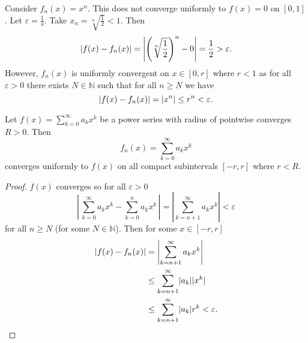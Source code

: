 \begin{example}
    Consider $f_n(x) = x^n$. This does not converge uniformly to $f(x) = 0$ on $[0, 1]$. Let $\varepsilon = \frac14$. Take $x_n = \sqrt[n]{\frac12} < 1$. Then \[ \lvert f(x) - f_n(x)\rvert = \left| \left( \sqrt[n]{\frac12} \right)^n - 0 \right| = \frac12 > \varepsilon. \] However, $f_n(x)$ is uniformly convergent on $x \in [0, r]$ where $r < 1$ as for all $\varepsilon > 0$ there exists $N \in \mathbb N$ such that for all $n \geq N$ we have \[ \lvert f(x) - f_n(x)\rvert = \lvert x^n\rvert \leq r^n < \varepsilon. \]
\end{example}

\begin{theorem}
    Let $f(x) = \sum_{k = 0}^\infty a_k x^k$ be a power series with radius of pointwise converges $R > 0$. Then \[ f_n(x) = \sum_{k = 0}^\infty a_k x^k \] converges uniformly to $f(x)$ on all compact subintervals $[-r, r]$ where $r < R$.
\end{theorem}

\begin{proof}
    $f(x)$ converges so for all $\varepsilon > 0$ \[ \left| \, \sum_{k = 0}^\infty a_k x^k - \sum_{k = 0}^n a_k x^k \, \right| = \left| \sum_{k = n+1}^\infty a_k x^k \right| < \varepsilon \] for all $n \geq N$ (for some $N \in \mathbb N$). Then for some $x \in [-r, r]$
    \begin{align*}
        \lvert f(x) - f_n(x)\rvert &= \left| \sum_{k = n + 1}^\infty a_k x^k \right| \\
        &\leq \sum_{k = n + 1}^\infty \lvert a_k\rvert \lvert x^k\rvert \\
        &\leq \sum_{k = n + 1}^\infty \lvert a_k\rvert r^k < \varepsilon.
    \end{align*}
\end{proof}

